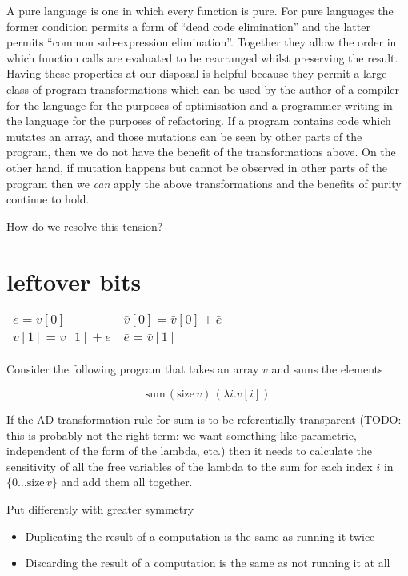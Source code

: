 \documentclass[12pt]{article}
\begin{document}
A pure language is one in which every function is pure.  For pure
languages the former condition permits a form of ``dead code
elimination'' and the latter permits ``common sub-expression
elimination''.  Together they allow the order in which function calls
are evaluated to be rearranged whilst preserving the result.  Having
these properties at our disposal is helpful because they permit a
large class of program transformations which can be used by the author
of a compiler for the language for the purposes of optimisation and a
programmer writing in the language for the purposes of refactoring.
If a program contains code which mutates an array, and those mutations
can be seen by other parts of the program, then we do not have the
benefit of the transformations above.  On the other hand, if mutation
happens but cannot be observed in other parts of the program then we
\emph{can} apply the above transformations and the benefits of purity
continue to hold.

How do we resolve this tension?  





\section{leftover bits}

\begin{tabular}[t]{ll}
  $e = v[0]$
  &
  $\bar{v}[0] = \bar{v}[0] + \bar{e}$
  \\
  
  $v[1] = v[1] + e$
  &
  $\bar{e} = \bar{v}[1]$
  \\
\end{tabular}

Consider the following program that takes an array $v$ and sums the
elements

\[
\textrm{sum} \, (\textrm{size} \, v) \, (\lambda i. v[i])
\]

If the AD transformation rule for sum is to be referentially
transparent (TODO: this is probably not the right term: we want
something like parametric, independent of the form of the lambda,
etc.) then it needs to calculate the sensitivity of all the free
variables of the lambda to the sum for each index $i$ in $\{ 0 \ldots
\textrm{size} \, v\}$ and add them all together.  

Put differently with greater symmetry

\begin{itemize}
 \item Duplicating the result of a computation is the same as running
   it twice

 \item Discarding the result of a computation is the same as not
   running it at all
\end{itemize}
\end{document}
